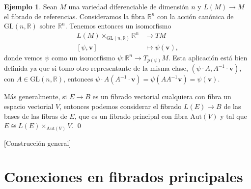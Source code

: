 \documentclass[12pt,a4paper]{article}
\theoremstyle{definition} \newtheorem{defn}[thm]{Definición}
\theoremstyle{definition} \newtheorem{ejemplo}[thm]{Ejemplo}
\theoremstyle{definition} \newtheorem{ejercicio}[thm]{Ejercicio}
\theoremstyle{remark} \newtheorem*{obs}{Observación}
\def\RR{\mathbb{R}}
\newcommand{\ve}[1]{\mathbf{#1}}
\begin{document}
      \begin{ejemplo}
	Sean $M$ una variedad diferenciable de dimensión $n$ y $L(M)\rightarrow M$ el fibrado de referencias. Consideramos la fibra $\RR^n$ con la acción canónica de $\mathrm{GL}(n,\RR)$ sobre $\RR^n$. Tenemos entonces un isomorfismo
	\begin{align*}
	  L(M)\times_{\mathrm{GL}(n,\RR)} \RR^n&\longrightarrow TM\\ 
	   [\psi, \ve{v}] &\longmapsto \psi(\ve{v}), 
	  \end{align*}
	  donde vemos $\psi$ como un isomorfismo $\psi:\RR^n \rightarrow T_{p(\psi)}M$. Esta aplicación está bien definida ya que si tomo otro representante de la misma clase, $(\psi \cdot A, A^{-1} \cdot \ve{v})$, con $A\in \mathrm{GL}(n,\RR)$, entonces $\psi\cdot A (A^{-1} \cdot \ve{v})= \psi(A A^{-1} \ve{v})=\psi(\ve{v})$. 

	  Más generalmente, si $E\rightarrow B$ es un fibrado vectorial cualquiera con fibra un espacio vectorial $V$, entonces podemos considerar el fibrado $L(E)\rightarrow B$ de las bases de las fibras de $E$, que es un fibrado principal con fibra $\mathrm{Aut}(V)$ y tal que $E\cong L(E)\times_{\mathrm{Aut}(V)} V$.
	  \qed
      \end{ejemplo}

      [Construcción general]

      \section{Conexiones en fibrados principales}
	      
	      



	    
\end{document}
